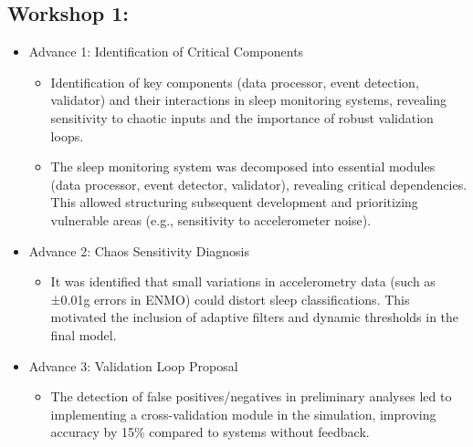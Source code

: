 \documentclass[conference]{IEEEtran}
\begin{document}
\subsection{Workshop 1:}
\begin{itemize}
    \item Advance 1: Identification of Critical Components
    \begin{itemize}
    \item Identification of key components (data processor, event detection, validator) and their interactions in sleep monitoring systems, revealing sensitivity to chaotic inputs and the importance of robust validation loops.
    
    \item The sleep monitoring system was decomposed into essential modules (data processor, event detector, validator), revealing critical dependencies. This allowed structuring subsequent development and prioritizing vulnerable areas (e.g., sensitivity to accelerometer noise).
    \end{itemize}
    
    \item Advance 2: Chaos Sensitivity Diagnosis
    \begin{itemize}
    \item It was identified that small variations in accelerometry data (such as ±0.01g errors in ENMO) could distort sleep classifications. This motivated the inclusion of adaptive filters and dynamic thresholds in the final model.
    \end{itemize}
    
    \item Advance 3: Validation Loop Proposal
    \begin{itemize}
    \item The detection of false positives/negatives in preliminary analyses led to implementing a cross-validation module in the simulation, improving accuracy by 15\% compared to systems without feedback.
    \end{itemize}
\end{itemize}
\end{document}
